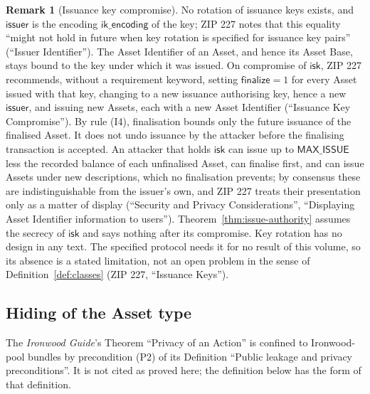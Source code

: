 \documentclass[11pt,a4paper]{article}
\theoremstyle{definition}
\newtheorem{remark}[theorem]{Remark}
\begin{document}
\begin{remark}[Issuance key compromise]\label{rem:key-compromise}
No rotation of issuance keys exists, and $\mathsf{issuer}$ is the encoding
$\mathsf{ik\_encoding}$ of the key; ZIP 227 notes that this equality
``might not hold in future when key rotation is specified for issuance key
pairs'' (``Issuer Identifier''). The Asset Identifier of an Asset, and hence
its Asset Base, stays bound to the key under which it was issued. On
compromise of $\mathsf{isk}$, ZIP 227 recommends, without a requirement
keyword, setting $\mathsf{finalize} = 1$ for every Asset issued with that
key, changing to a new issuance authorising key, hence a new
$\mathsf{issuer}$, and issuing new Assets, each with a new Asset
Identifier (``Issuance Key Compromise''). By rule (I4), finalisation bounds
only the future issuance of the finalised Asset. It does not undo issuance
by the attacker before the finalising transaction is accepted. An attacker
that holds $\mathsf{isk}$ can issue up to $\mathsf{MAX\_ISSUE}$ less the
recorded balance of each unfinalised Asset, can finalise first, and can
issue Assets under new descriptions, which no finalisation prevents; by
consensus these are indistinguishable from the issuer's own, and ZIP 227
treats their presentation only as a matter of display (``Security and
Privacy Considerations'', ``Displaying Asset Identifier information to
users''). Theorem~\ref{thm:issue-authority} assumes the secrecy of
$\mathsf{isk}$ and says nothing after its compromise. Key rotation has no
design in any text. The specified protocol needs it for no result of this
volume, so its absence is a stated limitation, not an open problem in the
sense of Definition~\ref{def:classes} (ZIP 227, ``Issuance Keys'').
\end{remark}

\FloatBarrier
\subsection{Hiding of the Asset type}\label{sec:security-privacy}

The \emph{Ironwood Guide}'s Theorem ``Privacy of an Action'' is confined to
Ironwood-pool bundles by precondition (P2) of its Definition ``Public
leakage and privacy preconditions''. It is not cited as proved here; the
definition below has the form of that definition.
\end{document}
